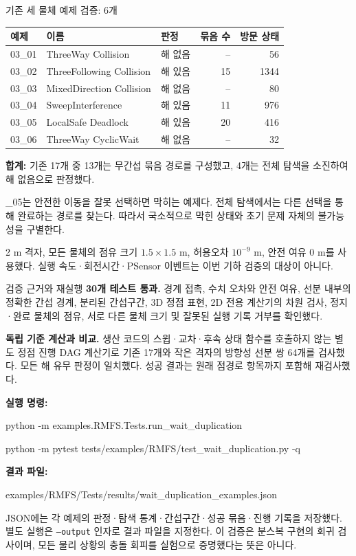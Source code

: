 \begin{frame}{기존 세 물체 예제 검증: 6개}
\small\renewcommand{\arraystretch}{1.2}
\begin{tabular}{p{1.1cm}p{5.8cm}p{2cm}rr}\toprule
예제 & 이름 & 판정 & 묶음 수 & 방문 상태\\\midrule
03\_01 & ThreeWay Collision & 해 없음 & -- & 56\\
03\_02 & ThreeFollowing Collision & 해 있음 & 15 & 1344\\
03\_03 & MixedDirection Collision & 해 없음 & -- & 80\\
03\_04 & SweepInterference & 해 있음 & 11 & 976\\
03\_05 & LocalSafe Deadlock & 해 있음 & 20 & 416\\
03\_06 & ThreeWay CyclicWait & 해 없음 & -- & 32\\\bottomrule
\end{tabular}
\par\bigskip
\textbf{합계:} 기존 17개 중 13개는 무간섭 묶음 경로를 구성했고,
4개는 전체 탐색을 소진하여 해 없음으로 판정했다.
\par{}\_05는 안전한 이동을 잘못 선택하면 막히는 예제다.
전체 탐색에서는 다른 선택을 통해 완료하는 경로를 찾는다.
따라서 국소적으로 막힌 상태와 초기 문제 자체의 불가능성을 구별한다.
\par\medskip\footnotesize
2 m 격자, 모든 물체의 점유 크기 $1.5\times1.5$ m,
허용오차 $10^{-9}$ m, 안전 여유 0 m를 사용했다.
실행 속도·회전시간·PSensor 이벤트는 이번 기하 검증의 대상이 아니다.
\end{frame}

\begin{frame}{검증 근거와 재실행}
\small
\textbf{30개 테스트 통과.} 경계 접촉, 수치 오차와 안전 여유, 선분 내부의 정확한
간섭 경계, 분리된 간섭구간, 3D 정점 표현, 2D 전용 계산기의 차원 검사,
정지·완료 물체의 점유, 서로 다른 물체 크기 및 잘못된 실행 기록 거부를 확인했다.
\par\medskip
\textbf{독립 기준 계산과 비교.} 생산 코드의 스윕·교차·후속 상태 함수를 호출하지 않는
별도 정점 진행 DAG 계산기로 기존 17개와 작은 격자의 방향성 선분 쌍 64개를 검사했다.
모든 해 유무 판정이 일치했다. 성공 결과는 원래 점경로 항목까지 포함해 재검사했다.
\par\medskip
\textbf{실행 명령:}\par\smallskip
{\scriptsize\ttfamily python -m examples.RMFS.Tests.run\_wait\_duplication}\par
{\scriptsize\ttfamily python -m pytest tests/examples/RMFS/test\_wait\_duplication.py -q}
\par\medskip
\textbf{결과 파일:}\par
{\scriptsize\ttfamily examples/RMFS/Tests/results/wait\_duplication\_examples.json}
\par\medskip\footnotesize
JSON에는 각 예제의 판정·탐색 통계·간섭구간·성공 묶음·진행 기록을 저장했다.
별도 실행은 \texttt{--output} 인자로 결과 파일을 지정한다.
이 검증은 분스복 구현의 회귀 검사이며, 모든 물리 상황의 충돌 회피를 실험으로 증명했다는 뜻은 아니다.
\end{frame}

